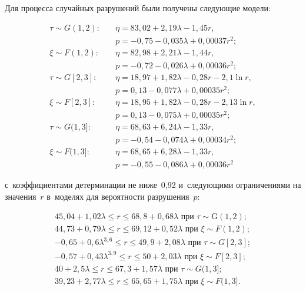 \begin{multicols}{2}
Для процесса случайных разрушений были получены сле\-ду\-ющие модели:

\noindent
\begin{align*}
\tau\sim {G}(1,2):\quad & \eta = 83{,}02+2{,}19\lambda-1{,}45r,\\
& p = -0{,}75-0{,}035\lambda+0{,}00037r^2;\\
\xi\sim F(1,2):\quad & \eta = 82{,}98+2{,}21\lambda-1{,}44r,\\
& p = -0{,}72-0{,}026\lambda+0{,}00036r^2;\\
\tau\sim {G}[2,3]:\quad & \eta = 18{,}97+1{,}82\lambda-0{,}28r-2{,}1\ln r,\\
& p = 0{,}13-0{,}077\lambda+0{,}00035r^2;\\
\xi\sim F[2,3]:\quad & \eta = 18{,}95+1{,}82\lambda-0{,}28r-2{,}13\ln r,\\
& p = 0{,}13-0{,}075\lambda+0{,}00035r^2;\\
\tau\sim {G}(1,3]:\quad & \eta = 68{,}63+6{,}24\lambda-1{,}33r,\\
& p = -0{,}54-0,074\lambda+0{,}00034r^2;\\
\xi\sim F(1,3]:\quad & \eta = 68{,}65+6,28\lambda-1{,}33r,\\
& p = -0{,}55-0{,}086\lambda+0{,}00036r^2
\end{align*}

\noindent 
с~коэффициентами детерминации не ниже~0,92 
и~сле\-ду\-ющи\-ми ограничениями на значения~$r$ в~моделях для 
ве\-ро\-ят\-ности разрушения~$p$:

\noindent
\begin{gather*}
45{,}04+1{,}02\lambda\leq r\leq 68{,}8+0{,}68\lambda \mbox{ при }
\tau\sim\mathrm{G}(1,2);\\
44{,}73+0{,}79\lambda\leq r\leq 69{,}12+0{,}52\lambda 
\mbox{ при } \xi\sim F(1,2);\\
-0{,}65+0{,}6\lambda^{3,6}\leq r\leq 49{,}9+2{,}08\lambda
\mbox{ при } \tau\sim {G}[2,3];\\
-0{,}57+0{,}43\lambda^{3,9}\leq r\leq 50+2{,}03\lambda \mbox{ при } \xi\sim F[2,3];\\
40+2{,}5\lambda\leq r\leq 67{,}3+1{,}57\lambda 
\mbox{ при } \tau\sim {G}(1,3];\\ 
39{,}23+2{,}77\lambda\leq r\leq 65{,}65+1{,}75\lambda 
\mbox{ при } \xi\sim F(1,3].
\end{gather*}


\end{multicols}
